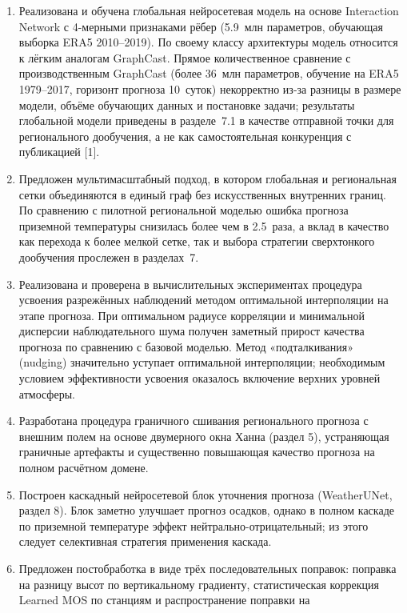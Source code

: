 \documentclass[14pt,a4paper]{extarticle}
\numberwithin{table}{section}
\numberwithin{figure}{section}
\numberwithin{equation}{section}
\begin{document}
\begin{enumerate}
\def\labelenumi{\arabic{enumi}.}
\item
  Реализована и обучена глобальная нейросетевая модель на основе
  Interaction Network с 4-мерными признаками рёбер
  (5.9~млн параметров, обучающая выборка ERA5 2010--2019). По
  своему классу архитектуры модель относится к лёгким аналогам GraphCast.
  Прямое количественное сравнение с производственным GraphCast
  (более 36~млн параметров, обучение на ERA5 1979--2017, горизонт прогноза
  10~суток) некорректно из-за разницы в размере модели,
  объёме обучающих данных и постановке задачи; результаты глобальной
  модели приведены в разделе~7.1 в качестве отправной точки для
  регионального дообучения, а не как самостоятельная конкуренция с
  публикацией [1].
\item
  Предложен мультимасштабный подход, в котором глобальная и
  региональная сетки объединяются в единый граф без искусственных
  внутренних границ. По сравнению с пилотной региональной моделью
  ошибка прогноза приземной температуры снизилась более чем в 2.5~раза,
  а вклад в качество как перехода к более мелкой сетке, так и выбора
  стратегии сверхтонкого дообучения прослежен в разделах~7.
\item
  Реализована и проверена в вычислительных экспериментах процедура
  усвоения разрежённых наблюдений методом оптимальной интерполяции
  на этапе прогноза. При оптимальном радиусе корреляции и минимальной
  дисперсии наблюдательного шума получен заметный прирост
  качества прогноза по сравнению с базовой моделью. Метод
  «подталкивания» (nudging) значительно уступает оптимальной
  интерполяции; необходимым условием эффективности усвоения оказалось
  включение верхних уровней атмосферы.
\item
  Разработана процедура граничного сшивания регионального
  прогноза с внешним полем на основе двумерного окна Ханна (раздел 5),
  устраняющая граничные артефакты и существенно повышающая качество
  прогноза на полном расчётном домене.
\item
  Построен каскадный нейросетевой блок уточнения прогноза
  (WeatherUNet, раздел 8). Блок заметно улучшает прогноз осадков, однако
  в полном каскаде по приземной температуре эффект нейтрально-отрицательный;
  из этого следует селективная стратегия применения каскада.
\item
  Предложен постобработка в виде трёх последовательных поправок:
  поправка на разницу высот по вертикальному градиенту, статистическая
  коррекция Learned MOS по станциям и распространение поправки на

\end{enumerate}
\end{document}
